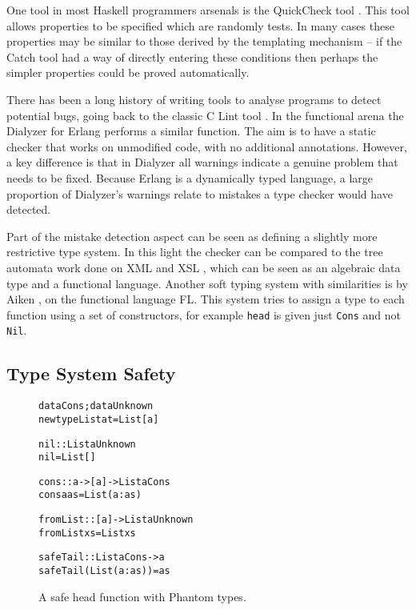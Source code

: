 \documentclass[preprint]{sigplanconf}
\newcommand{\T}[1]{\texttt{#1}}
\newcommand{\C}[1]{\textsf{#1}}
\newenvironment{code}{\begin{alltt}\small}{\end{alltt}}
\begin{document}
One tool in most Haskell programmers arsenals is the QuickCheck tool \citep{quickcheck}. This tool allows properties to be specified which are randomly tests. In many cases these properties may be similar to those derived by the templating mechanism -- if the Catch tool had a way of directly entering these conditions then perhaps the simpler properties could be proved automatically.

There has been a long history of writing tools to analyse programs to detect potential bugs, going back to the classic C Lint tool \citep{lint}. In the functional arena the Dialyzer \citep{dialyzer} for Erlang \citep{erlang} performs a similar function. The aim is to have a static checker that works on unmodified code, with no additional annotations. However, a key difference is that in Dialyzer all warnings indicate a genuine problem that needs to be fixed. Because Erlang is a dynamically typed language, a large proportion of Dialyzer's warnings relate to mistakes a type checker would have detected.

Part of the mistake detection aspect can be seen as defining a slightly more restrictive type system. In this light the checker can be compared to the tree automata work done on XML \citep{xml} and XSL \citep{static_xslt}, which can be seen as an algebraic data type and a functional language. Another soft typing system with similarities is by Aiken \cite{aiken:type_infer}, on the functional language FL. This system tries to assign a type to each function using a set of constructors, for example \T{head} is given just \T{Cons} and not \T{Nil}.

\subsection{Type System Safety}

\begin{figure}
\begin{code}
data Cons; data Unknown
newtype List a t = List [a]

nil :: List a Unknown
nil = List []

cons :: a -> [a] -> List a Cons
cons a as = List (a:as)

fromList :: [a] -> List a Unknown
fromList xs = List xs

safeTail :: List a Cons -> a
safeTail (List (a:as)) = as
\end{code}
\caption{A safe \C{head} function with Phantom types.}
\label{fig:phantom}
\end{figure}
\end{document}
